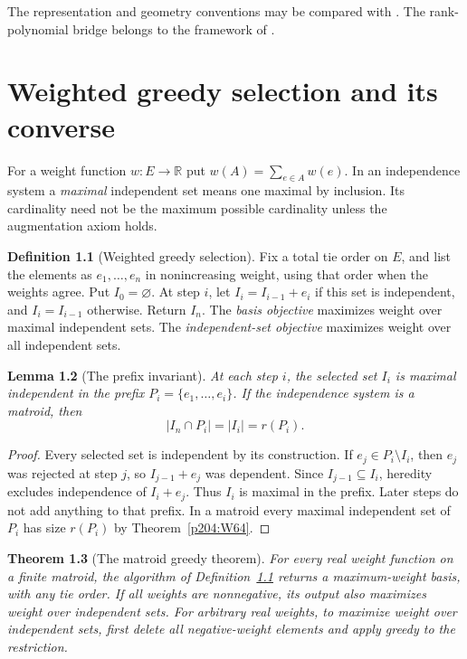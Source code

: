 \documentclass[11pt,oneside,openany]{book}
\theoremstyle{plain}
\newtheorem{theorem}{Theorem}[chapter]
\newtheorem{lemma}[theorem]{Lemma}
\theoremstyle{definition}
\newtheorem{definition}[theorem]{Definition}
\theoremstyle{remark}
\begin{document}
The representation and geometry conventions may be compared with
\cite[Sections 1.5--1.7 and Chapters 5--6, 9]{Oxley}. The
rank-polynomial bridge belongs to the framework of \cite{Tutte}.
\chapter{Weighted greedy selection and its converse}
\label{p204:ch12}

For a weight function \(w:E\to\mathbb R\) put
\(w(A)=\sum_{e\in A}w(e)\). In an independence system a
\emph{maximal} independent set means one maximal by inclusion.
Its cardinality need not be the maximum possible cardinality
unless the augmentation axiom holds.

\begin{definition}[Weighted greedy selection]
\label{p204:W78}
Fix a total tie order on \(E\), and list the elements as
\(e_1,\dots,e_n\) in nonincreasing weight, using that order
when the weights agree. Put \(I_0=\varnothing\). At step
\(i\), let \(I_i=I_{i-1}+e_i\) if this set is independent,
and \(I_i=I_{i-1}\) otherwise. Return \(I_n\).
The \emph{basis objective} maximizes weight over maximal
independent sets. The \emph{independent-set objective}
maximizes weight over all independent sets.
\end{definition}

\begin{lemma}[The prefix invariant]
At each step \(i\), the selected set \(I_i\) is maximal
independent in the prefix \(P_i=\{e_1,\dots,e_i\}\).
If the independence system is a matroid, then
\[
 |I_n\cap P_i|=|I_i|=r(P_i).
\]
\end{lemma}

\begin{proof}
Every selected set is independent by its construction.
If \(e_j\in P_i\setminus I_i\), then \(e_j\) was rejected
at step \(j\), so \(I_{j-1}+e_j\) was dependent.
Since \(I_{j-1}\subseteq I_i\), heredity excludes
independence of \(I_i+e_j\). Thus \(I_i\) is maximal in
the prefix. Later steps do not add anything to that prefix.
In a matroid every maximal independent set of \(P_i\)
has size \(r(P_i)\) by Theorem~\ref{p204:W64}.
\end{proof}

\begin{theorem}[The matroid greedy theorem]
\label{p204:W79}
For every real weight function on a finite matroid, the
algorithm of Definition~\ref{p204:W78} returns a
maximum-weight basis, with any tie order.
If all weights are nonnegative, its output also maximizes
weight over independent sets. For arbitrary real weights,
to maximize weight over independent sets, first delete all
negative-weight elements and apply greedy to the restriction.
\end{theorem}
\end{document}
